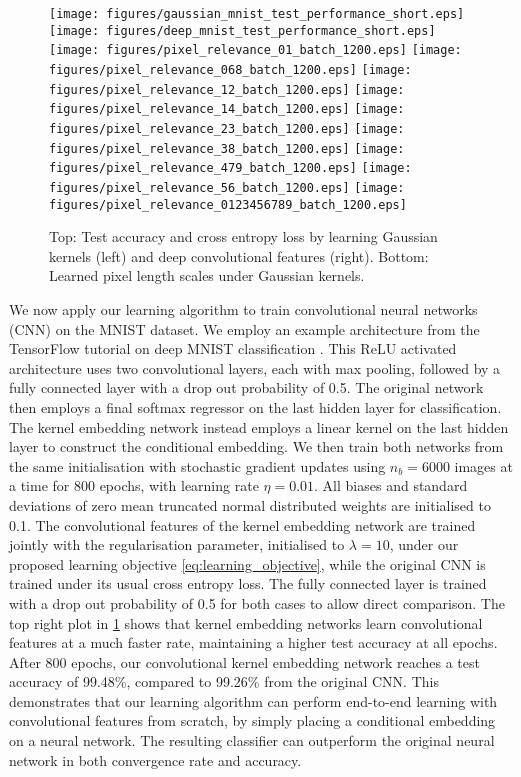 \documentclass{article}
\begin{document}
		\begin{figure}[t]
			\centering 
			\texttt{[image: figures/gaussian\_mnist\_test\_performance\_short.eps]}
			\texttt{[image: figures/deep\_mnist\_test\_performance\_short.eps]}
			\texttt{[image: figures/pixel\_relevance\_01\_batch\_1200.eps]}
			\texttt{[image: figures/pixel\_relevance\_068\_batch\_1200.eps]}
			\texttt{[image: figures/pixel\_relevance\_12\_batch\_1200.eps]}
			\texttt{[image: figures/pixel\_relevance\_14\_batch\_1200.eps]}
			\texttt{[image: figures/pixel\_relevance\_23\_batch\_1200.eps]}
			\texttt{[image: figures/pixel\_relevance\_38\_batch\_1200.eps]}
			\texttt{[image: figures/pixel\_relevance\_479\_batch\_1200.eps]}
			\texttt{[image: figures/pixel\_relevance\_56\_batch\_1200.eps]}
			\texttt{[image: figures/pixel\_relevance\_0123456789\_batch\_1200.eps]}
			\caption{Top: Test accuracy and cross entropy loss by learning Gaussian kernels (left) and deep convolutional features (right). Bottom: Learned pixel length scales under Gaussian kernels.}
			\label{fig:mnist_experiments}
		\end{figure}
		
		We now apply our learning algorithm to train convolutional neural networks (CNN) on the MNIST dataset. We employ an example architecture from the TensorFlow tutorial on deep MNIST classification \citep{abadi2016tensorflow}. This ReLU activated architecture uses two convolutional layers, each with max pooling, followed by a fully connected layer with a drop out probability of 0.5. The original network then employs a final softmax regressor on the last hidden layer for classification. The kernel embedding network instead employs a linear kernel on the last hidden layer to construct the conditional embedding. We then train both networks from the same initialisation with stochastic gradient updates using $n_{b} = 6000$ images at a time for 800 epochs, with learning rate $\eta = 0.01$. All biases and standard deviations of zero mean truncated normal distributed weights are initialised to 0.1. The convolutional features of the kernel embedding network are trained jointly with the regularisation parameter, initialised to $\lambda = 10$, under our proposed learning objective \eqref{eq:learning_objective}, while the original CNN is trained under its usual cross entropy loss. The fully connected layer is trained with a drop out probability of 0.5 for both cases to allow direct comparison. The top right plot in \cref{fig:mnist_experiments} shows that kernel embedding networks learn convolutional features at a much faster rate, maintaining a higher test accuracy at all epochs. After 800 epochs, our convolutional kernel embedding network reaches a test accuracy of 99.48\%, compared to 99.26\% from the original CNN. This demonstrates that our learning algorithm can perform end-to-end learning with convolutional features from scratch, by simply placing a conditional embedding on a neural network. The resulting classifier can outperform the original neural network in both convergence rate and accuracy.
	
\end{document}
